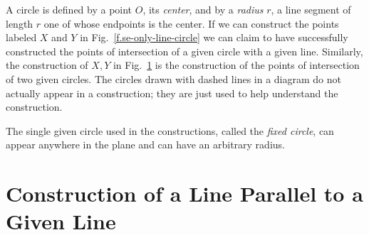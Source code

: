 A circle is defined by a point $O$, its \emph{center}, and by a  \emph{radius} $r$, a line segment of length $r$ one of whose endpoints is the center. If we can construct the points labeled $X$ and $Y$ in Fig.~\ref{f.se-only-line-circle} we can claim to have successfully constructed the points of intersection of a given circle with a given line. Similarly, the construction of $X,Y$ in Fig.~\ref{f.se-only-two-circles} is the construction of the points of intersection of two given circles. The circles drawn with dashed lines in a diagram do not actually appear in a construction; they are just used to help understand the construction.

The single given circle used in the constructions, called the \emph{fixed circle}, can appear anywhere in the plane and can have an arbitrary radius.

\begin{figure}[t]
\subfigures
{}
\hfill
{}
\label{f.se-only-line-circle}
\label{f.se-only-two-circles}
\end{figure}

\section{Construction of a Line Parallel to a Given Line}\label{s.parallel}

